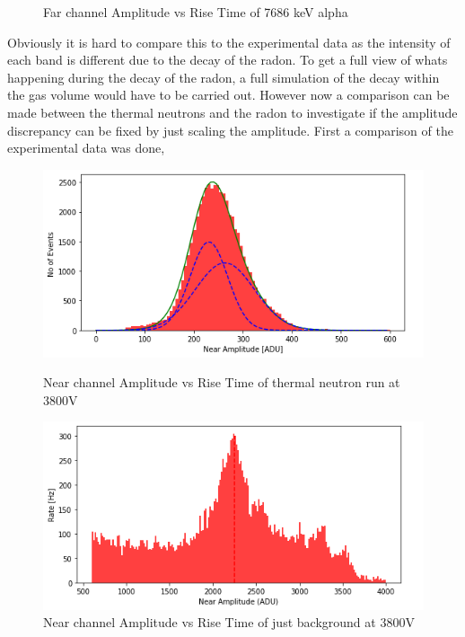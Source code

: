 \documentclass[a4paper]{article}
\begin{document}
\begin{figure}[H]
\begin{minipage}{0.5\textwidth}
        \caption{Far channel Amplitude vs Rise Time of 7686  keV alpha}
        \label{fig:prob1_6_1}
    \end{minipage}
\end{figure}
\noindent Obviously it is hard to compare this to the experimental data as the intensity of each band is different due to the decay of the radon. To get a full view of whats happening during the decay of the radon, a full simulation of the decay within the gas volume would have to be carried out.
\newline However now a comparison can be made between the thermal neutrons and the radon to investigate if the amplitude discrepancy can be fixed by just scaling the amplitude. First a comparison of the experimental data was done,
\begin{figure}[H]
    \centering
    \begin{minipage}{.5\textwidth}
        \centering
        \includegraphics[width=1\linewidth]{Radon/uk24n001_amp2.png}
        \caption{Near channel Amplitude vs Rise Time of thermal neutron run at 3800V}
        \label{fig:prob1_6_2}
    \end{minipage}%
    \begin{minipage}{0.5\textwidth}
        \centering
        \includegraphics[width=1\linewidth]{Radon/va28n002_alphas2.png}
        \caption{Near channel Amplitude vs Rise Time of just background at 3800V}
        \label{fig:prob1_6_1}
    \end{minipage}
\end{figure}
\end{document}
